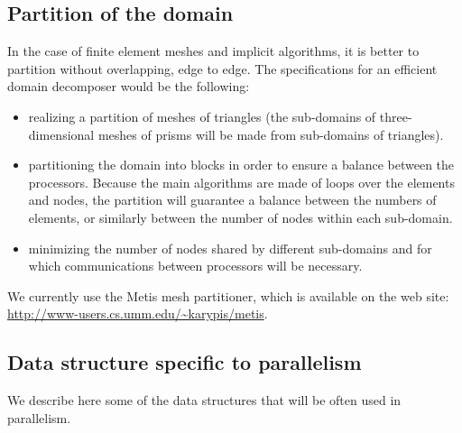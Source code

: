 \subsection{Partition of the domain}

In the case of finite element meshes and implicit algorithms, it is better to
partition without overlapping, edge to edge. The specifications for an
efficient domain decomposer would be the following:
\begin{itemize}
  \item realizing a partition of meshes of triangles (the sub-domains of
    three-dimensional meshes of prisms will be made from sub-domains of
    triangles).
  \item partitioning the domain into blocks in order to ensure a balance
    between the processors. Because the main algorithms are made of loops over
    the elements and nodes, the partition will guarantee a balance between the
    numbers of elements, or similarly between the number of nodes within each
    sub-domain.
  \item minimizing the number of nodes shared by different sub-domains and for
    which communications between processors will be necessary.
\end{itemize}

We currently use the Metis mesh partitioner, which is available on the web
site: \url{http://www-users.cs.umm.edu/~karypis/metis}.

\subsection{Data structure specific to parallelism}

We describe here some of the data structures that will be often used in
parallelism.

